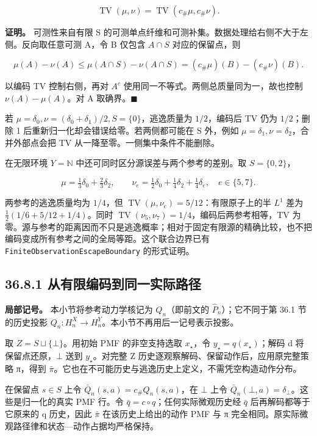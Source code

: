 \documentclass[
  11pt,
  oneside]{book}
\begin{document}
\[\operatorname{TV}(\mu,\nu)=\operatorname{TV}(c_\#\mu,c_\#\nu).\]

\textbf{证明。} 可测性来自有限 S 的可测单点纤维和可测补集。数据处理给右侧不大于左侧。反向取任意可测 A，令 B 仅包含 \(A\cap S\) 对应的保留点，则

\[\mu(A)-\nu(A)\le\mu(A\cap S)-\nu(A\cap S)
=(c_\#\mu)(B)-(c_\#\nu)(B).\]

以编码 TV 控制右侧，再对 \(A^c\) 使用同一不等式。两侧总质量同为一，故也控制 \(\nu(A)-\mu(A)\)。对 A 取确界。\(\blacksquare\)

若 \(\mu=\delta_0,\nu=(\delta_0+\delta_1)/2,S=\{0\}\)，逃逸质量为 \(1/2\)，编码后 TV 仍为 \(1/2\)；删除 1 后重新归一化却会错误给零。若两侧都可能在 S 外，例如 \(\mu=\delta_1,\nu=\delta_2\)，合并外部点会把 TV 从一降至零。一侧集中条件不能删除。

在无限环境 \(Y=\mathbb N\) 中还可同时区分源误差与两个参考的差别。取 \(S=\{0,2\}\)，

\[\mu=\tfrac13\delta_0+\tfrac23\delta_2,\qquad
\nu_e=\tfrac12\delta_0+\tfrac14\delta_2+\tfrac14\delta_e,
\quad e\in\{5,7\}.\]

两参考的逃逸质量均为 \(1/4\)，但 \(\operatorname{TV}(\mu,\nu_e)=5/12\)：有限原子上的半 \(L^1\) 差为 \(\tfrac12(1/6+5/12+1/4)\)。同时 \(\operatorname{TV}(\nu_5,\nu_7)=1/4\)，编码后两参考相等，TV 为零。源与参考的距离因而不只是逃逸概率；相对于固定有限源的精确比较，也不把编码变成所有参考之间的全局等距。这个联合边界已有 \nolinkurl{FiniteObservationEscapeBoundary} 的形式证明。

\subsection{36.8.1 从有限编码到同一实际路径}\label{ux4eceux6709ux9650ux7f16ux7801ux5230ux540cux4e00ux5b9eux9645ux8defux5f84}

\textbf{局部记号。} 本小节将参考动力学核记为 \(Q_n\)（即前文的 \(\widehat P_n\)）；它不同于第 36.1 节的历史投影 \(Q_n:H_n^X\to H_n^Y\)。本小节不再用后一记号表示投影。

取 \(Z=S\sqcup\{\bot\}\)。用初始 PMF 的非空支持选取 \(x_\star\)，令 \(y_\star=q(x_\star)\)；解码 d 将保留点还原，\(\bot\) 送到 \(y_\star\)。对完整 Z 历史逐观察解码、保留动作后，应用原完整策略 π，得到 \(\bar\pi\)。它也在不可能历史与逃逸历史上定义，不需凭空构造动作分布。

在保留点 \(s\in S\) 上令 \(\bar Q_n(s,a)=c_\#Q_n(s,a)\)，在 \(\bot\) 上令 \(\bar Q_n(\bot,a)=\delta_\bot\)。这些是归一化的真实 PMF 行。令 \(\bar q=c\circ q\)；任何实际微观历史经 \(\bar q\) 后再解码都等于它原来的 q 历史，因此 \(\bar\pi\) 在该历史上给出的动作 PMF 与 π 完全相同。原实际微观路径律和状态---动作占据均严格保持。
\end{document}
